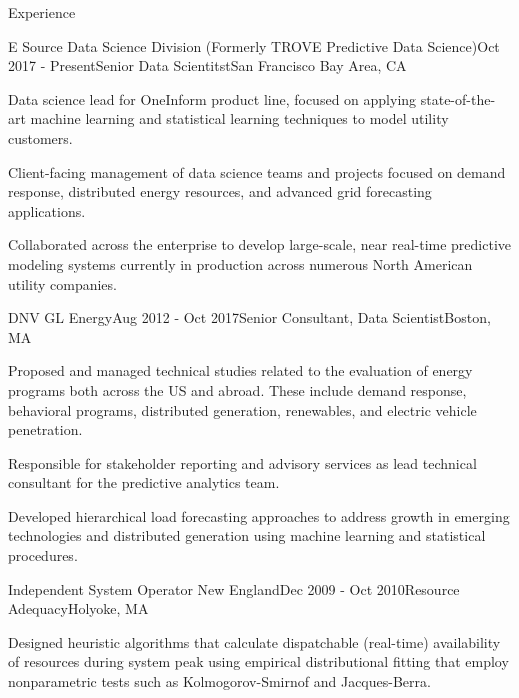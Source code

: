 \documentclass{resume} %
\begin{document}

\begin{rSection}{Experience}
\begin{rSubsection}{E Source Data Science Division (Formerly TROVE Predictive Data Science)}{Oct 2017 - Present}{Senior Data Scientitst}{San Francisco Bay Area, CA}
\item Data science lead for OneInform product line, focused on applying state-of-the-art machine learning and statistical learning techniques to model utility customers.
\item Client-facing management of data science teams and projects focused on
demand response, distributed energy resources, and advanced grid forecasting applications.
\item Collaborated across the enterprise to develop large-scale, near real-time predictive modeling systems currently in production across numerous North American utility companies.
\end{rSubsection}


\begin{rSubsection}{DNV GL Energy}{Aug 2012 - Oct 2017}{Senior Consultant, Data Scientist}{Boston, MA}
\item Proposed and managed technical studies related to the evaluation of energy programs both across the US and abroad. These include demand response, behavioral programs, distributed generation, renewables, and electric vehicle  penetration.
\item Responsible for stakeholder reporting and advisory services as lead technical consultant for the  predictive analytics team.
\item Developed hierarchical load forecasting approaches to address growth in emerging technologies and distributed generation using machine learning and statistical procedures.

\end{rSubsection}


\begin{rSubsection}{Independent System Operator New England}{Dec 2009 - Oct 2010}{Resource Adequacy}{Holyoke, MA}

\item Designed heuristic algorithms that calculate dispatchable (real-time) availability of resources during system peak using empirical distributional fitting that employ nonparametric tests such as Kolmogorov-Smirnof and Jacques-Berra.


\end{rSubsection}
\end{rSection}
\end{document}
